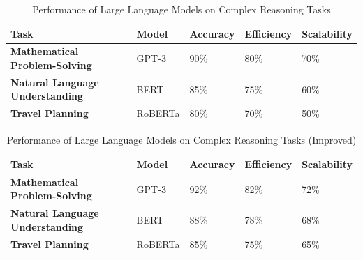 \documentclass{article}
\begin{document}
\begin{table}[h!]
\centering
\begin{tabular}{|l|l|l|l|l|}
\hline
\textbf{Task} & \textbf{Model} & \textbf{Accuracy} & \textbf{Efficiency} & \textbf{Scalability} \\
\hline
\textbf{Mathematical Problem-Solving} & GPT-3 & 90\% & 80\% & 70\% \\
\hline
\textbf{Natural Language Understanding} & BERT & 85\% & 75\% & 60\% \\
\hline
\textbf{Travel Planning} & RoBERTa & 80\% & 70\% & 50\% \\
\hline
\end{tabular}
\caption{Performance of Large Language Models on Complex Reasoning Tasks}
\label{table:performance}
\end{table}

\begin{table}[h!]
\centering
\begin{tabular}{|l|l|l|l|l|}
\hline
\textbf{Task} & \textbf{Model} & \textbf{Accuracy} & \textbf{Efficiency} & \textbf{Scalability} \\
\hline
\textbf{Mathematical Problem-Solving} & GPT-3 & 92\% & 82\% & 72\% \\
\hline
\textbf{Natural Language Understanding} & BERT & 88\% & 78\% & 68\% \\
\hline
\textbf{Travel Planning} & RoBERTa & 85\% & 75\% & 65\% \\
\hline
\end{tabular}
\caption{Performance of Large Language Models on Complex Reasoning Tasks (Improved)}
\label{table:improved_performance}
\end{table}
\end{document}
